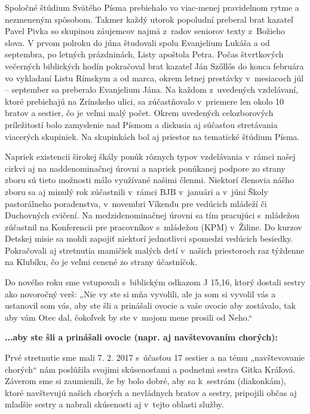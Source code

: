Spoločné štúdium Svätého Písma prebiehalo vo viac-menej pravidelnom rytme a nezmeneným spôsobom. Takmer každý utorok popoludní preberal brat kazateľ Pavel Pivka so skupinou záujemcov najmä z~radov seniorov texty z~Božieho slova. V prvom polroku do júna študovali spolu Evanjelium Lukáša a od septembra, po letných prázdninách, Listy apoštola Petra. Počas štvrtkových večerných biblických hodín pokračoval brat kazateľ Ján Szőllős do konca februára vo vykladaní Listu Rímskym a od marca, okrem letnej prestávky v~mesiacoch júl – september sa preberalo Evanjelium Jána. Na každom z~uvedených vzdelávaní, ktoré prebiehajú na Zrínskeho ulici, sa zúčastňovalo v~priemere len okolo 10 bratov a sestier, čo je veľmi malý počet.  Okrem uvedených celozborových príležitostí bolo zamyslenie nad Písmom a diskusia aj súčasťou stretávania viacerých skupiniek. Na skupinkách bol aj priestor na tematické štúdium Písma.

Napriek existencii širokej škály ponúk rôznych typov vzdelávania v~rámci našej cirkvi aj na naddenominačnej úrovni a napriek ponúkanej podpore zo strany zboru sú tieto možnosti málo využívané našimi členmi. Niektorí členovia nášho zboru sa aj minulý rok zúčastnili v~rámci BJB v~januári a v~júni Školy pastorálneho poradenstva, v~novembri Víkendu pre vedúcich mládeží či Duchovných cvičení. Na medzidenominačnej úrovni sa tím pracujúci s~mládežou zúčastnil na Konferencii pre pracovníkov s~mládežou (KPM) v~Žiline. Do kurzov Detskej misie sa mohli zapojiť niektorí jednotlivci spomedzi vedúcich besiedky.
Pokračovali aj stretnutia mamičiek malých detí v~našich priestoroch raz týždenne na Klubíku, čo je veľmi cenené zo strany účastníčok.



Do nového roku sme vstupovali s~biblickým odkazom J 15,16, ktorý dostali sestry ako novoročný verš: „Nie vy ste si mňa vyvolili, ale ja som si vyvolil vás a ustanovil som vás, aby ste šli a prinášali ovocie a vaše ovocie aby zostávalo, tak aby vám Otec dal, čokoľvek by ste v~mojom mene prosili od Neho.“

{\bf ...aby ste šli a prinášali ovocie (napr. aj navštevovaním chorých):}

Prvé stretnutie sme mali 7. 2. 2017 s~účasťou 17 sestier a na tému „navštevovanie chorých“ nám poslúžila svojimi skúsenosťami a podnetmi sestra Gitka Kráľová. Záverom sme si zaumienili, že by bolo dobré, aby sa k~sestrám (diakonkám), ktoré navštevujú našich chorých a nevládnych bratov a sestry, pripojili občas aj mladšie sestry a nabrali skúsenosti aj v~tejto oblasti služby.

